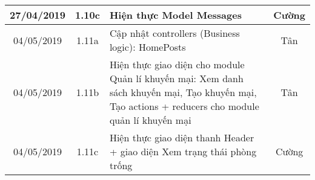 \begin{center}
\begin{longtable}{ | c | c | p{5cm} |c|}
		27/04/2019 & 1.10c & Hiện thực Model Messages  & Cường \\ \hline
		04/05/2019 & 1.11a & Cập nhật controllers (Business logic): HomePosts  & Tân \\ \hline
		04/05/2019 & 1.11b & Hiện thực giao diện cho module Quản lí khuyến mại: Xem danh sách khuyến mại, Tạo khuyến mại, Tạo actions + reducers cho module quản lí khuyến mại  & Tân \\ \hline
		04/05/2019 & 1.11c & Hiện thực giao diện thanh Header + giao diện Xem trạng thái phòng trống  & Cường \\ \hline
		\end{longtable}
\end{center}